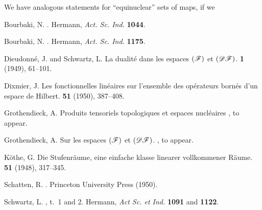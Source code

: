 \documentclass{article}
\theoremstyle{plain}
\newcommand{\DF}{\mbox{\normalfont($\mathscr{DF}$)}}
\newcommand{\FF}{\mbox{\normalfont($\mathscr{F}$)}}
\begin{document}
We have analogous statements for ``equinuclear'' sets of maps, if we 






\nocite{*}

\begin{thebibliography}{9}

  {\sc Bourbaki, N.}
  .
  \newblock Hermann, {\em Act. Sc. Ind.} \textbf{1044}.

  {\sc Bourbaki, N.}
  .
  \newblock Hermann, {\em Act. Sc. Ind.} \textbf{1175}.

  {\sc Dieudonn\'{e}, J. and Schwartz, L.}
  \newblock La dualit\'{e} dans les espaces $\FF$ et $\DF$.
   \textbf{1} (1949), 61--101.

  {\sc Dixmier, J.}
  \newblock Les fonctionnelles lin\'{e}aires sur l'ensemble des op\'{e}rateurs born\'{e}s d'un espace de Hilbert.
   \textbf{51} (1950), 387--408.

  {\sc Grothendieck, A.}
  \newblock Produits tensoriels topologiques et espaces nucl\'{e}aires
  , to appear.

  {\sc Grothendieck, A.}
  \newblock Sur les espaces $\FF$ et $\DF$.
  , to appear.

  {\sc K\"{o}the, G.}
  \newblock Die Stufenr\"{a}ume, eine einfache klasse linearer vollkommener R\"{a}ume.
   \textbf{51} (1948), 317--345.

  {\sc Schatten, R.}
  .
  \newblock Princeton University Press (1950).

  {\sc Schwartz, L.}
  , t.~1 and 2.
  \newblock Hermann, {\em Act Sc. et Ind.} \textbf{1091} and \textbf{1122}.

\end{thebibliography}
\end{document}
